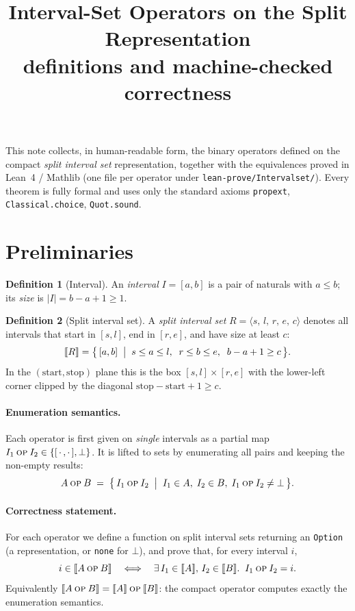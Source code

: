 \documentclass[11pt]{article}
\title{Interval-Set Operators on the Split Representation\\
       \large definitions and machine-checked correctness}
\author{}
\date{}
\newcommand{\sem}[1]{\llbracket #1 \rrbracket}            %
\newcommand{\Empty}{\bot}                                 %
\newcommand{\size}[1]{\lvert #1 \rvert}
\newcommand{\R}[5]{\langle #1,\, #2,\, #3,\, #4,\, #5 \rangle} %
\theoremstyle{definition}
\newtheorem{definition}{Definition}
\theoremstyle{plain}
\begin{document}
\maketitle

\noindent
This note collects, in human-readable form, the binary operators defined on the
compact \emph{split interval set} representation, together with the equivalences
proved in Lean~4 / Mathlib (one file per operator under
\texttt{lean-prove/Intervalset/}).  Every theorem is fully formal and uses only
the standard axioms \texttt{propext}, \texttt{Classical.choice},
\texttt{Quot.sound}.

\section{Preliminaries}

\begin{definition}[Interval]
An \emph{interval} $I = [a, b]$ is a pair of naturals with $a \le b$; its
\emph{size} is $\size{I} = b - a + 1 \ge 1$.
\end{definition}

\begin{definition}[Split interval set]
A \emph{split interval set} $R = \R{s}{l}{r}{e}{c}$ denotes all intervals that
start in $[s, l]$, end in $[r, e]$, and have size at least $c$:
\[
  \sem{R} = \bigl\{\, [a, b] \;\bigm|\;
            s \le a \le l,\;\; r \le b \le e,\;\; b - a + 1 \ge c \,\bigr\}.
\]
In the $(\text{start},\text{stop})$ plane this is the box $[s,l]\times[r,e]$ with
the lower-left corner clipped by the diagonal $\text{stop}-\text{start}+1 \ge c$.
\end{definition}

\paragraph{Enumeration semantics.}
Each operator is first given on \emph{single} intervals as a partial map
$I_1 \mathbin{\textsc{op}} I_2 \in \{[\,\cdot\,,\cdot\,], \Empty\}$.  It is lifted
to sets by enumerating all pairs and keeping the non-empty results:
\[
  A \mathbin{\textsc{op}} B \;=\;
  \bigl\{\, I_1 \mathbin{\textsc{op}} I_2 \;\bigm|\; I_1 \in A,\; I_2 \in B,\;
            I_1 \mathbin{\textsc{op}} I_2 \neq \Empty \,\bigr\}.
\]

\paragraph{Correctness statement.}
For each operator we define a function on split interval sets returning an
\texttt{Option} (a representation, or \texttt{none} for $\Empty$), and prove that,
for every interval $i$,
\[
  i \in \sem{A \mathbin{\textsc{op}} B}
  \quad\Longleftrightarrow\quad
  \exists\, I_1 \in \sem{A},\, I_2 \in \sem{B}.\;\;
  I_1 \mathbin{\textsc{op}} I_2 = i .
\]
Equivalently $\sem{A \mathbin{\textsc{op}} B} = \sem{A} \mathbin{\textsc{op}}
\sem{B}$: the compact operator computes exactly the enumeration semantics.
\end{document}
